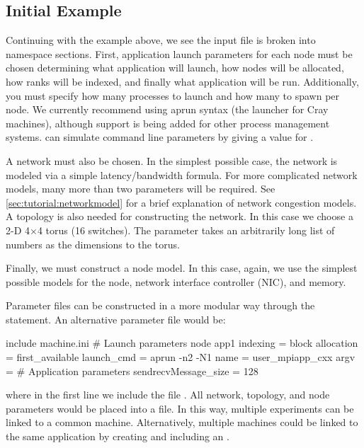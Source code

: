 \subsection{Initial Example}
\label{subsec:initialExample}
Continuing with the example above, we see the input file is broken into namespace sections. 
First, application launch parameters for each node must be chosen determining what application will launch, 
how nodes will be allocated, how ranks will be indexed, and finally what application will be run.  
Additionally, you must specify how many processes to launch and how many to spawn per node.  
We currently recommend using aprun syntax (the launcher for Cray machines), 
although support is being added for other process management systems.
\sstmacro can simulate command line parameters by giving a value for .

A network must also be chosen.  
In the simplest possible case, the network is modeled via a simple latency/bandwidth formula.  
For more complicated network models, many more than two parameters will be required. 
See \ref{sec:tutorial:networkmodel} for a brief explanation of \sstmacro network congestion models. 
A topology is also needed for constructing the network.  
In this case we choose a 2-D 4$\times$4 torus (16 switches).  The  
parameter takes an arbitrarily long list of numbers as the dimensions to the torus.

Finally, we must construct a node model.  
In this case, again, we use the simplest possible models for the node, 
network interface controller (NIC), and memory.  

Parameter files can be constructed in a more modular way through the  statement.  
An alternative parameter file would be:

\begin{ViFile}
include machine.ini
# Launch parameters
node {
 app1 {
  indexing = block
  allocation = first_available
  launch_cmd = aprun -n2 -N1
  name = user_mpiapp_cxx
  argv = 
  # Application parameters
  sendrecvMessage_size = 128
 }
}

\end{ViFile}
where in the first line we include the file .  
All network, topology, and node parameters would be placed into a  file.  
In this way, multiple experiments can be linked to a common machine.  
Alternatively, multiple machines could be linked to the same application by creating and including an .
